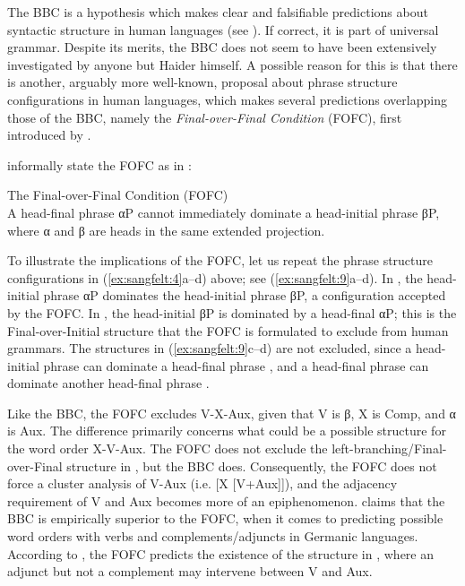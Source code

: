 \documentclass[output=paper, colorlinks, citecolor=brown]{langscibook}
\begin{document}
The BBC is a hypothesis which makes clear and falsifiable predictions about syntactic structure in human languages (see \citealt{Haider2013}). If correct, it is part of universal grammar. Despite its merits, the BBC does not seem to have been extensively investigated by anyone but Haider himself. A possible reason for this is that there is another, arguably more well-known, proposal about phrase structure configurations in human languages, which makes several predictions overlapping those of the BBC, namely the \textit{Final-over-Final Condition} (FOFC), first introduced by \citet{Holmberg2000}.


\citet[171]{BiberauerEtAl2014} informally state the FOFC as in : 

\ea The Final-over-Final Condition (FOFC)\label{ex:sangfelt:8}\\
A head-final phrase αP cannot immediately dominate a head-initial phrase βP, where
α and β are heads in the same extended projection.
\z 

To illustrate the implications of the FOFC, let us repeat the phrase structure configurations in (\ref{ex:sangfelt:4}a–d) above; see (\ref{ex:sangfelt:9}a–d). In , the head-initial phrase αP dominates the head-initial phrase βP, a configuration accepted by the FOFC. In , the head-initial βP is dominated by a head-final αP; this is the Final-over-Initial structure that the FOFC is formulated to exclude from human grammars. The structures in (\ref{ex:sangfelt:9}c–d) are not excluded, since a head-initial phrase can dominate a head-final phrase , and a head-final phrase can dominate another head-final phrase .

\settowidth{}
\ea\label{ex:sangfelt:9}
\z 
\z 


Like the BBC, the FOFC excludes V-X-Aux, given that V is β, X is Comp, and α is Aux. The difference primarily concerns what could be a possible structure for the word order X-V-Aux. The FOFC does not exclude the left-branching/Final-over-Final structure in , but the BBC does. Consequently, the FOFC does not force a cluster analysis of V-Aux (i.e. [X [V+Aux]]), and the adjacency requirement of V and Aux becomes more of an epiphenomenon. \citet[132--133]{Haider2013} claims that the BBC is empirically superior to the FOFC, when it comes to predicting possible word orders with verbs and complements\slash adjuncts in Germanic languages. According to \citet[133]{Haider2013}, the FOFC predicts the existence of the structure in , where an adjunct but not a complement may intervene between V and Aux.
\end{document}
